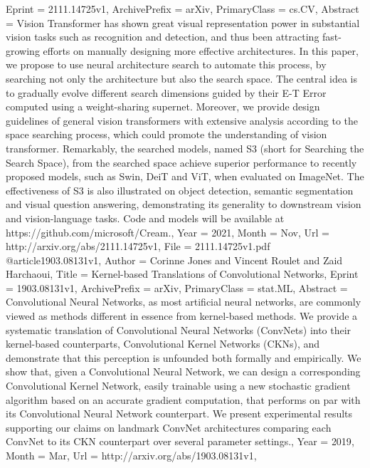 {{{{Eprint        = {2111.14725v1},
ArchivePrefix = {arXiv},
PrimaryClass  = {cs.CV},
Abstract      = {Vision Transformer has shown great visual representation power in substantial
vision tasks such as recognition and detection, and thus been attracting
fast-growing efforts on manually designing more effective architectures. In
this paper, we propose to use neural architecture search to automate this
process, by searching not only the architecture but also the search space. The
central idea is to gradually evolve different search dimensions guided by their
E-T Error computed using a weight-sharing supernet. Moreover, we provide design
guidelines of general vision transformers with extensive analysis according to
the space searching process, which could promote the understanding of vision
transformer. Remarkably, the searched models, named S3 (short for Searching the
Search Space), from the searched space achieve superior performance to recently
proposed models, such as Swin, DeiT and ViT, when evaluated on ImageNet. The
effectiveness of S3 is also illustrated on object detection, semantic
segmentation and visual question answering, demonstrating its generality to
downstream vision and vision-language tasks. Code and models will be available
at https://github.com/microsoft/Cream.},
Year          = {2021},
Month         = {Nov},
Url           = {http://arxiv.org/abs/2111.14725v1},
File          = {2111.14725v1.pdf}
}
@article{1903.08131v1,
Author        = {Corinne Jones and Vincent Roulet and Zaid Harchaoui},
Title         = {Kernel-based Translations of Convolutional Networks},
Eprint        = {1903.08131v1},
ArchivePrefix = {arXiv},
PrimaryClass  = {stat.ML},
Abstract      = {Convolutional Neural Networks, as most artificial neural networks, are
commonly viewed as methods different in essence from kernel-based methods. We
provide a systematic translation of Convolutional Neural Networks (ConvNets)
into their kernel-based counterparts, Convolutional Kernel Networks (CKNs), and
demonstrate that this perception is unfounded both formally and empirically. We
show that, given a Convolutional Neural Network, we can design a corresponding
Convolutional Kernel Network, easily trainable using a new stochastic gradient
algorithm based on an accurate gradient computation, that performs on par with
its Convolutional Neural Network counterpart. We present experimental results
supporting our claims on landmark ConvNet architectures comparing each ConvNet
to its CKN counterpart over several parameter settings.},
Year          = {2019},
Month         = {Mar},
Url           = {http://arxiv.org/abs/1903.08131v1},
}}}}
